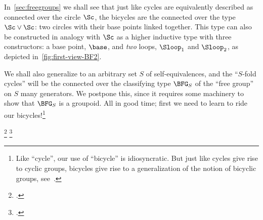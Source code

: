 \begin{remark}\label{rem:F2-first-look}
  In~\cref{sec:freegroups} we shall see that
  just like cycles are equivalently described as connected
  \coverings over the circle $\Sc$,
  the bicycles are the connected \coverings
  over the type $\Sc\vee\Sc$: two circles with their base points
  linked together.
  This type can also be constructed in analogy with $\Sc$ as
  a higher inductive type with three constructors:
  a base point, $\base$, and \emph{two} loops, $\Sloop_1$ and $\Sloop_2$,
  as depicted in~\cref{fig:first-view-BF2}.
\begin{marginfigure}
  \noindent{}
  \caption{The type $\Sc\vee\Sc$ is a point
    with two loops attached. }
  \label{fig:first-view-BF2}
\end{marginfigure}

  We shall also generalize to an arbitrary set $S$ of
  self-equivalences, and the ``$S$-fold cycles'' will be the connected
  \coverings over the classifying type $\BFG_S$ of the ``free group''
  on $S$ many generators. We postpone this, since it requires
  some machinery to show that $\BFG_S$ is a groupoid.
  All in good time; first
  we need to learn to ride our bicycles!\footnote{%
  Like ``cycle'', our use of ``bicycle'' is idiosyncratic.
  But just like cycles give rise to cyclic groups,
  bicycles give rise to a generalization of the notion of bicyclic groups,
  see~\citeauthor{Douglas1951I}\footnotemark{}\footnotemark{}.}%
\addtocounter{footnote}{-1}\footcitetext{Douglas1951I}%
\footcitetext{Douglas1961}
\end{remark}

